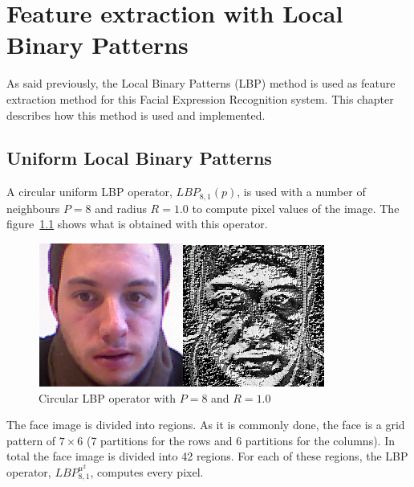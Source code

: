 \chapter{Feature extraction with Local Binary Patterns}
\label{chap:implementation_lbp}

\noindent As said previously, the Local Binary Patterns (LBP) method is used as feature extraction method for this Facial Expression Recognition system. This chapter describes how this method is used and implemented.
\newline

\section{Uniform Local Binary Patterns}

\vspace{\baselineskip}
\noindent A circular uniform LBP operator, $ LBP_{8,1}(p) $, is used with a number of neighbours $ P = 8 $ and radius $ R = 1.0 $ to compute pixel values of the image. The figure~\ref{lbp_implementation_example} shows what is obtained with this operator. 
\newline

\begin{figure}[!h]
\begin{center}
\noindent \includegraphics[scale=0.8]{figures/lbp_implementation_example} 
\newline
\caption{Circular LBP operator with $ P = 8 $ and $ R = 1.0 $}
\label{lbp_implementation_example}
\end{center} 
\end{figure}

\noindent The face image is divided into regions. As it is commonly done, the face is a grid pattern of $ 7\times6 $ (7 partitions for the rows and 6 partitions for the columns). In total the face image is divided into 42 regions. For each of these regions, the LBP operator, $ LBP_{8,1}^{u^2} $, computes every pixel.
\newline

